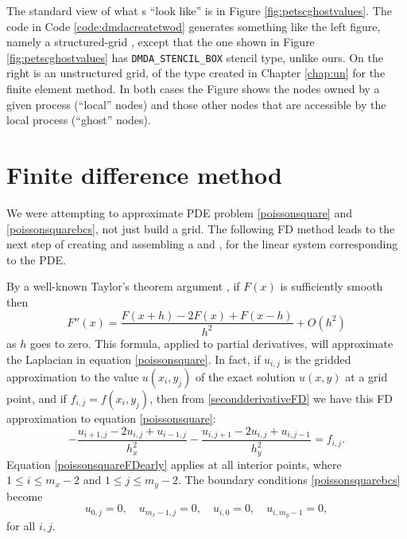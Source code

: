 The standard \PETSc view of what \pDM s ``look like'' is in Figure \ref{fig:petscghostvalues}.  The code in Code \ref{code:dmdacreatetwod} generates something like the left figure, namely a structured-grid \pDM, except that the one shown in Figure \ref{fig:petscghostvalues} has \texttt{DMDA\_STENCIL\_BOX} stencil type, unlike ours.  On the right is an unstructured grid, of the type created in Chapter \ref{chap:un} for the finite element method.  In both cases the Figure shows the nodes owned by a given process (``local'' nodes) and those other nodes that are accessible by the local process (``ghost'' nodes).


\section{Finite difference method}

We were attempting to approximate PDE problem \eqref{poissonsquare} and \eqref{poissonsquarebcs}, not just build a grid.  The following FD method leads to the next step of creating and assembling a \pMat and \pVecs, for the linear system corresponding to the PDE.

By a well-known Taylor's theorem argument \citep{MortonMayers2005}, if $F(x)$ is sufficiently smooth then
\begin{equation}
   F''(x) = \frac{F(x+h) - 2 F(x) + F(x-h)}{h^2} + O(h^2)  \label{secondderivativeFD}
\end{equation}
as $h$ goes to zero.  This formula, applied to partial derivatives, will approximate the Laplacian in equation \eqref{poissonsquare}.  In fact, if $u_{i,j}$ is the gridded approximation to the value $u(x_i,y_j)$ of the exact solution $u(x,y)$ at a grid point, and if $f_{i,j} = f(x_i,y_j)$, then from \eqref{secondderivativeFD} we have this FD approximation to equation \eqref{poissonsquare}:
\begin{equation}
- \frac{u_{i+1,j} - 2 u_{i,j} + u_{i-1,j}}{h_x^2} - \frac{u_{i,j+1} - 2 u_{i,j} + u_{i,j-1}}{h_y^2} = f_{i,j}. \label{poissonsquareFDearly}
\end{equation}
Equation \eqref{poissonsquareFDearly} applies at all interior points, where $1 \le i \le m_x-2$ and $1 \le j \le m_y-2$.  The boundary conditions \eqref{poissonsquarebcs} become
\begin{equation}
u_{0,j} = 0, \quad u_{m_x-1,j} = 0, \quad u_{i,0} = 0, \quad u_{i,m_y-1} = 0, \label{poissonsquareFDbcs}
\end{equation}
for all $i,j$.

